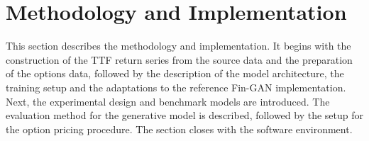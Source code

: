 \section{Methodology and Implementation}\label{sec:methodology}

This section describes the methodology and implementation. It begins with the construction of the TTF return series from the source data and the preparation of the options data, followed by the description of the model architecture, the training setup and the adaptations to the reference Fin-GAN implementation. Next, the experimental design and benchmark models are introduced. The evaluation method for the generative model is described, followed by the setup for the option pricing procedure. The section closes with the software environment.










